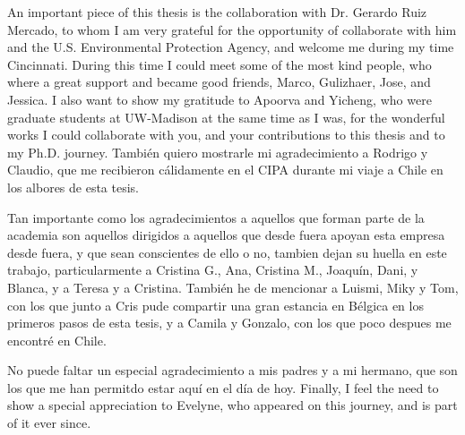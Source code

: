 An important piece of this thesis is the collaboration with Dr. Gerardo Ruiz Mercado, to whom I am very grateful for the opportunity of collaborate with him and the U.S. Environmental Protection Agency, and welcome me during my time Cincinnati. During this time I could meet some of the most kind people, who where a great support and became good friends, Marco, Gulizhaer, Jose, and Jessica. I also want to show my gratitude to Apoorva and Yicheng, who were graduate students at UW-Madison at the same time as I was, for the wonderful works I could collaborate with you, and your contributions to this thesis and to my Ph.D. journey. También quiero mostrarle mi agradecimiento a Rodrigo y Claudio, que me recibieron cálidamente en el CIPA durante mi viaje a Chile en los albores de esta tesis. 

Tan importante como los agradecimientos a aquellos que forman parte de la academia son aquellos dirigidos a aquellos que desde fuera apoyan esta empresa desde fuera, y que sean conscientes de ello o no, tambien dejan su huella en este trabajo, particularmente a Cristina G., Ana, Cristina M., Joaquín, Dani, y Blanca, y a Teresa y a Cristina. También he de mencionar a Luismi, Miky y Tom, con los que junto a Cris pude compartir una gran estancia en Bélgica en los primeros pasos de esta tesis, y a Camila y Gonzalo, con los que poco despues me encontré en Chile. 

No puede faltar un especial agradecimiento a mis padres y a mi hermano, que son los que me han permitdo estar aquí en el día de hoy. Finally, I feel the need to show a special appreciation to Evelyne, who appeared on this journey, and is part of it ever since.

\endgroup
